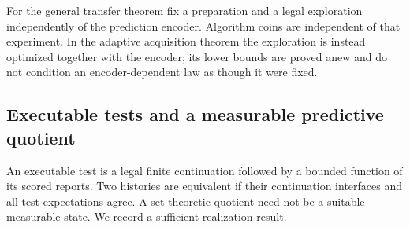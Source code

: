 For the general transfer theorem fix a preparation and a legal exploration independently of the prediction encoder. Algorithm coins are independent of that experiment. In the adaptive acquisition theorem the exploration is instead optimized together with the encoder; its lower bounds are proved anew and do not condition an encoder-dependent law as though it were fixed.

\subsection{Executable tests and a measurable predictive quotient}
An executable test is a legal finite continuation followed by a bounded function of its scored reports. Two histories are equivalent if their continuation interfaces and all test expectations agree. A set-theoretic quotient need not be a suitable measurable state. We record a sufficient realization result.

